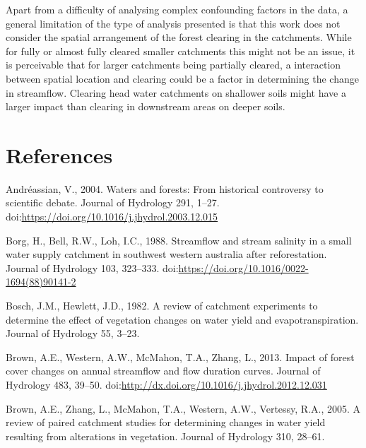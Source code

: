 \documentclass[]{elsarticle} %
\begin{document}
Apart from a difficulty of analysing complex confounding factors in the
data, a general limitation of the type of analysis presented is that
this work does not consider the spatial arrangement of the forest
clearing in the catchments. While for fully or almost fully cleared
smaller catchments this might not be an issue, it is perceivable that
for larger catchments being partially cleared, a interaction between
spatial location and clearing could be a factor in determining the
change in streamflow. Clearing head water catchments on shallower soils
might have a larger impact than clearing in downstream areas on deeper
soils.

\hypertarget{references}{%
\section*{References}\label{references}}

\hypertarget{refs}{}
\leavevmode\hypertarget{ref-andreassian2004}{}%
Andréassian, V., 2004. Waters and forests: From historical controversy
to scientific debate. Journal of Hydrology 291, 1--27.
doi:\href{https://doi.org/https://doi.org/10.1016/j.jhydrol.2003.12.015}{https://doi.org/10.1016/j.jhydrol.2003.12.015}

\leavevmode\hypertarget{ref-borg1988}{}%
Borg, H., Bell, R.W., Loh, I.C., 1988. Streamflow and stream salinity in
a small water supply catchment in southwest western australia after
reforestation. Journal of Hydrology 103, 323--333.
doi:\href{https://doi.org/https://doi.org/10.1016/0022-1694(88)90141-2}{https://doi.org/10.1016/0022-1694(88)90141-2}

\leavevmode\hypertarget{ref-hewlett1984}{}%
Bosch, J.M., Hewlett, J.D., 1982. A review of catchment experiments to
determine the effect of vegetation changes on water yield and
evapotranspiration. Journal of Hydrology 55, 3--23.

\leavevmode\hypertarget{ref-brown2013}{}%
Brown, A.E., Western, A.W., McMahon, T.A., Zhang, L., 2013. Impact of
forest cover changes on annual streamflow and flow duration curves.
Journal of Hydrology 483, 39--50.
doi:\href{https://doi.org/http://dx.doi.org/10.1016/j.jhydrol.2012.12.031}{http://dx.doi.org/10.1016/j.jhydrol.2012.12.031}

\leavevmode\hypertarget{ref-brown2005}{}%
Brown, A.E., Zhang, L., McMahon, T.A., Western, A.W., Vertessy, R.A.,
2005. A review of paired catchment studies for determining changes in
water yield resulting from alterations in vegetation. Journal of
Hydrology 310, 28--61.
\end{document}
